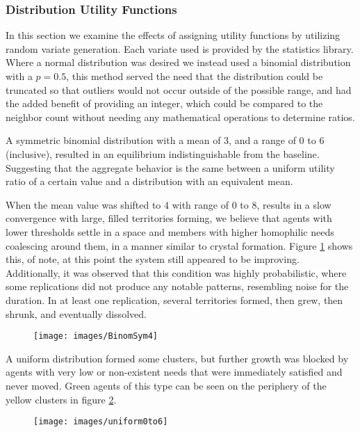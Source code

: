 \documentclass[sigplan,nonacm]{acmart}
\begin{document}
\subsubsection{Distribution Utility Functions}

In this section we examine the effects of assigning utility functions by utilizing random variate generation.
Each variate used is provided by the  statistics library.
Where a normal distribution was desired we instead used a binomial distribution with a \(p=0.5\),
this method served the need that the distribution could be truncated so that outliers would not occur
outside of the possible range, and had the added benefit of providing an integer, which could be compared 
to the neighbor count without needing any mathematical operations to determine ratios.

A symmetric binomial distribution with a mean of 3, and a range of 0 to 6 (inclusive), resulted in an equilibrium indistinguishable from the baseline.
Suggesting that the aggregate behavior is the same between a uniform utility ratio of a certain value and a distribution 
with an equivalent mean.

When the mean value was shifted to 4 with range of 0 to 8, results in a slow convergence with large, filled territories forming,
we believe that agents with lower thresholds settle in a space and members with higher homophilic needs coalescing around
them, in a manner similar to crystal formation. Figure \ref{fig:binomsym4} shows this, of note, at this point the system 
still appeared to be improving. Additionally, it was observed that this condition was highly probabilistic, where some replications did not
produce any notable patterns, resembling noise for the duration.
In at least one replication, several territories formed, then grew, then shrunk, and eventually dissolved. 

\begin{figure}
	\centering
	\texttt{[image: images/BinomSym4]}
	\caption{}
	\label{fig:binomsym4}
\end{figure}

A uniform distribution formed some clusters, but further growth was blocked by agents with very low or non-existent needs 
that were immediately satisfied and never moved. Green agents of this type can be seen on the periphery of the yellow 
clusters in figure \ref{fig:uniform0to6}.

\begin{figure}
	\centering
	\texttt{[image: images/uniform0to6]}
	\caption{}
	\label{fig:uniform0to6}
\end{figure}
\end{document}

